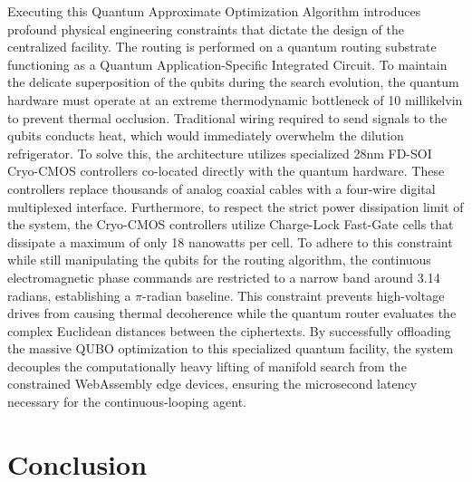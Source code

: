\documentclass[12pt]{article}
\begin{document}
Executing this Quantum Approximate Optimization Algorithm introduces profound physical engineering constraints that dictate the design of the centralized facility. The routing is performed on a quantum routing substrate functioning as a Quantum Application-Specific Integrated Circuit. To maintain the delicate superposition of the qubits during the search evolution, the quantum hardware must operate at an extreme thermodynamic bottleneck of 10 millikelvin to prevent thermal occlusion. Traditional wiring required to send signals to the qubits conducts heat, which would immediately overwhelm the dilution refrigerator. To solve this, the architecture utilizes specialized 28nm FD-SOI Cryo-CMOS controllers co-located directly with the quantum hardware. These controllers replace thousands of analog coaxial cables with a four-wire digital multiplexed interface. Furthermore, to respect the strict power dissipation limit of the system, the Cryo-CMOS controllers utilize Charge-Lock Fast-Gate cells that dissipate a maximum of only 18 nanowatts per cell. To adhere to this constraint while still manipulating the qubits for the routing algorithm, the continuous electromagnetic phase commands are restricted to a narrow band around 3.14 radians, establishing a $\pi$-radian baseline. This constraint prevents high-voltage drives from causing thermal decoherence while the quantum router evaluates the complex Euclidean distances between the ciphertexts. By successfully offloading the massive QUBO optimization to this specialized quantum facility, the system decouples the computationally heavy lifting of manifold search from the constrained WebAssembly edge devices, ensuring the microsecond latency necessary for the continuous-looping agent.

\section{Conclusion}
\end{document}
